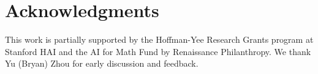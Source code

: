 \documentclass{article}
\begin{document}


\section*{Acknowledgments}
\label{sec:ack}
This work is partially supported by the Hoffman-Yee Research Grants program at Stanford HAI and the AI for Math Fund by Renaissance Philanthropy. We thank Yu (Bryan) Zhou for early discussion and feedback.




\nocite{poesia2024learning, ye2024reasoning, xin2024advancing, li2025proving, liang2025mps, zhang2025deeptheorem, dong2025beyond, wang2025kimina, deepseekproverv2}
% 

\clearpage
\appendix


\end{document}

